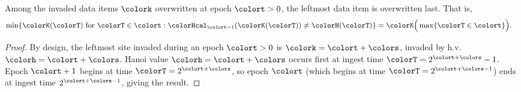 \begin{lemma}
\label{thm:tilted-last-overwritten}
Among the invaded data items $\colork$ overwritten at epoch $\colort > 0$, the leftmost data item is overwritten last.
That is,
\begin{align*}
\min\{ \colorK(\colorT) \text{ for } \colorT \in \colort : \colorHcal_{\colort-1}(\colorK(\colorT)) \neq \colorH(\colorT) \}
&=
\colorK\Big(\max \{ \colorT \in \colort \}\Big).
\end{align*}
\end{lemma}
\begin{proof}
By design, the leftmost site invaded during an epoch $\colort > 0$ is $\colork = \colort + \colors$, invaded by h.v. $\colorh = \colort + \colors$.
Hanoi value $\colorh = \colort + \colors$ occurs first at ingest time $\colorT = 2^{\colort + \colors} - 1$.
Epoch $\colort + 1$ begins at time $\colorT = 2^{\colort + \colors}$, so epoch $\colort$ (which begins at time $\colorT = 2^{\colort + \colors - 1}$) ends at ingest time $2^{\colort + \colors - 1}$, giving the result.
\end{proof}
